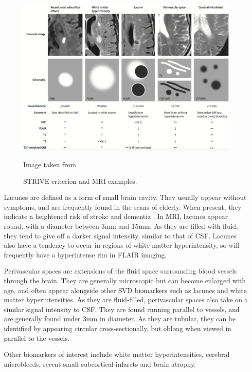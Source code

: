 \begin{figure}[ht]
	\centering
	\includegraphics[width = \textwidth]{Images/2_STRIVE.png}
	\caption{STRIVE criterion and MRI examples.}
	\small Image taken from \cite{WardlawJ.M.2013Nsfr}
\end{figure}

Lacunes are defined as a form of small brain cavity. They usually appear without symptoms, and are frequently found in the scans of elderly. When present, they indicate a heightened risk of stroke and dementia \cite{VanDerFlierM.Wiesje2005SVDa, BenjaminJ.Philip2018LIbN}. In MRI, lacunes appear round, with a diameter between 3mm and 15mm. As they are filled with fluid, they tend to give off a darker signal intensity, similar to that of CSF. Lacunes also have a tendency to occur in regions of white matter hyperintensity, so will frequently have a hyperintense rim in FLAIR imaging.

Perivascular spaces are extensions of the fluid space surrounding blood vessels through the brain. They are generally microscopic but can become enlarged with age, and often appear alongside other SVD biomarkers such as lacunes and white matter hyperintensities. As they are fluid-filled, perivascular spaces also take on a similar signal intensity to CSF. They are found running parallel to vessels, and are generally found under 3mm in diameter. As they are tubular, they can be identified by appearing circular cross-sectionally, but oblong when viewed in parallel to the vessels.

Other biomarkers of interest include white matter hyperintensities, cerebral microbleeds, recent small subcortical infarcts and brain atrophy. 

